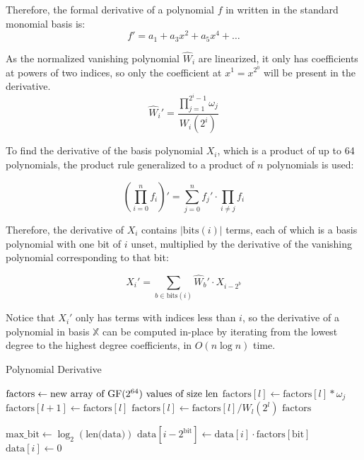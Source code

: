 Therefore, the formal derivative of a polynomial $f$ in  written in the standard monomial basis is:
\[f' = a_1 + a_3 x^2 + a_5 x^4 + \ldots\]

As the normalized vanishing polynomial $\hat{W}_i$ are linearized, it only has coefficients at powers of two indices, so only the coefficient at $x^1 = x^{2^0}$ will be present in the derivative.
\[\hat{W}_i' = \frac{\prod_{j = 1}^{2^i - 1} \omega_j}{W_i(2^i)}\]

To find the derivative of the basis polynomial $X_i$, which is a product of up to 64 polynomials, the product rule generalized to a product of $n$ polynomials is used:

\[
(\prod_{i = 0}^{n} f_i)' = \sum_{j = 0}^{n} f_j' \cdot \prod_{i \neq j} f_i
\]

Therefore, the derivative of $X_i$ contains $|\text{bits}(i)|$ terms, each of which is a basis polynomial with one bit of $i$ unset, multiplied by the derivative of the vanishing polynomial corresponding to that bit:

\[
X_i' = \sum_{b \in \text{bits}(i)} \hat{W}_b' \cdot X_{i - 2^b}
\]

Notice that $X_i'$ only has terms with indices less than $i$, so the derivative of a polynomial in basis $\mathbb{X}$ can be computed in-place by iterating from the lowest degree to the highest degree coefficients, in $O(n \log n)$ time.

\begin{algorithm}
    \caption{Polynomial Derivative}
    \begin{algorithmic}
            \State $\text{factors} \gets \text{new array of $\text{GF}(2^{64})$ values of size } \text{len}$
                    \State $\text{factors}[l] \gets \text{factors}[l] * \omega_j$
                \EndFor
                    \State $\text{factors}[l + 1] \gets \text{factors}[l]$
                \EndIf
                \State $\text{factors}[l] \gets \text{factors}[l] / W_l(2^l)$
            \EndFor
            \State \Return $\text{factors}$
        \EndFunction
    \end{algorithmic}
    \begin{algorithmic}
            \State $\text{max\_bit} \gets \log_2(\text{len(data)})$
                    \State $\text{data}[i - 2^{\text{bit}}] \gets \text{data}[i] \cdot \text{factors}[\text{bit}]$
                \EndFor
                \State $\text{data}[i] \gets 0$
            \EndFor
        \EndFunction
    \end{algorithmic}
\end{algorithm}

